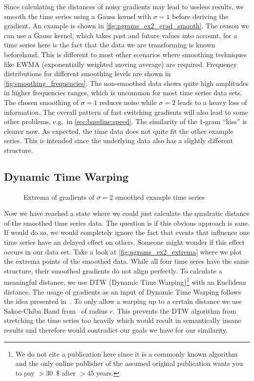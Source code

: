 Since calculating the distances of noisy gradients may lead to useless results, we smooth the time series using a Gauss kernel with $\sigma = 1$ before deriving the gradient. An example is shown in \autoref{fig:ngrams_ex2_grad_smooth}. The reason we can use a Gauss kernel, which takes past and future values into account, for a time series here is the fact that the data we are transforming is known beforehand. This is different to most other scenarios where smoothing techniques like EWMA (exponentially weighted moving average) are required. Frequency distributions for different smoothing levels are shown in \autoref{fig:smoothing_frequencies}. The non-smoothed data shows quite high amplitudes in higher frequencies ranges, which is uncommon for most time series data sets. The chosen smoothing of $\sigma = 1$ reduces noise while $\sigma = 2$ leads to a heavy loss of information. The overall pattern of fast switching gradients will also lead to some other problems, e.g.\ in \autoref{sec:baseline:speed}. The similarity of the $1$-gram \enquote{kiss} is clearer now. As expected, the time data does not quite fit the other example series. This is intended since the underlying data also has a slightly different structure.


\subsection{Dynamic Time Warping}
\label{ssec:baseline:sim:dtw}

\begin{figure}
    \centering
    
    \caption{Extrema of gradients of $\sigma = 2$ smoothed example time series}\label{fig:ngrams_ex2_extrema}
\end{figure}

Now we have reached a state where we could just calculate the quadratic distance of the smoothed time series data. The question is if this obvious approach is sane. If would do so, we would completely ignore the fact that events that influence one time series have an delayed effect on others. Someone might wonder if this effect occurs in our data set. Take a look at \autoref{fig:ngrams_ex2_extrema} where we plot the extrema points of the smoothed data. While all four time seres have the same structure, their smoothed gradients do not align perfectly. To calculate a meaningful distance, we use DTW (Dynamic Time Warping)\footnote{We do not cite a publication here since it is a commonly known algorithm and the only online publisher of the assumed original publication wants you to pay $>$\SI{30}{\$} after $>$\num{45} years.} with an Euclidean distance. The usage of gradients as an input of Dynamic Time Warping follows the idea presented in~\cite{DDTW}. To only allow a warping up to a certain distance we use Sakoe-Chiba Band from~\cite{sakoe} of radius $r$. This prevents the DTW algorithm from stretching the time series too heavily which would result in semantically insane results and therefore would contradict our goals we have for our similarity.


